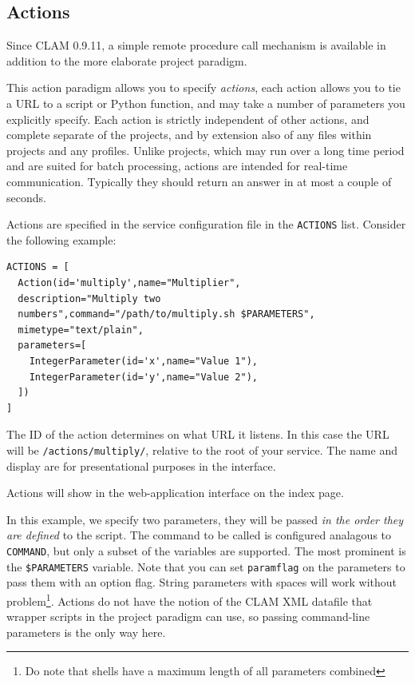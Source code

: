 \documentclass[a4paper,12pt,twoside,openright]{report}
\begin{document}
\subsection{Actions}

Since CLAM 0.9.11, a simple remote procedure call mechanism is available in
addition to the more elaborate project paradigm. 

This action paradigm allows you to specify \emph{actions}, each action allows
you to tie a URL to a script or Python function, and may take a number of
parameters you explicitly specify. Each action is strictly independent of other
actions, and complete separate of the projects, and by extension also of any
files within projects and any profiles. Unlike projects, which may run over a
long time period and are suited for batch processing, actions are intended for
real-time communication. Typically they should return an answer in at most a
couple of seconds.

Actions are specified in the service configuration file in the \texttt{ACTIONS}
list. Consider the following example:


{ \small
\begin{verbatim}
ACTIONS = [
  Action(id='multiply',name="Multiplier",
  description="Multiply two
  numbers",command="/path/to/multiply.sh $PARAMETERS",
  mimetype="text/plain",
  parameters=[
    IntegerParameter(id='x',name="Value 1"),
    IntegerParameter(id='y',name="Value 2"),
  ])
]
\end{verbatim}
}

The ID of the action determines on what URL it listens. In this case the URL
will be \texttt{/actions/multiply/}, relative to the root of your service. The
name and display are for presentational purposes in the interface.

Actions will show in the web-application interface on the index page.

In this example, we specify two parameters, they will be passed \emph{in the
order they are defined} to the script. The command to be called is configured
analagous to \texttt{COMMAND}, but only a subset of the variables are
supported. The most prominent is the \texttt{\$PARAMETERS} variable. Note that
you can set \texttt{paramflag} on the parameters to pass them with an option
flag. String parameters with spaces will work without problem\footnote{Do note that
shells have a maximum length of all parameters combined}. Actions do not have
the notion of the CLAM XML datafile that wrapper scripts in the project
paradigm can use, so passing command-line parameters is the only way here.
\end{document}
